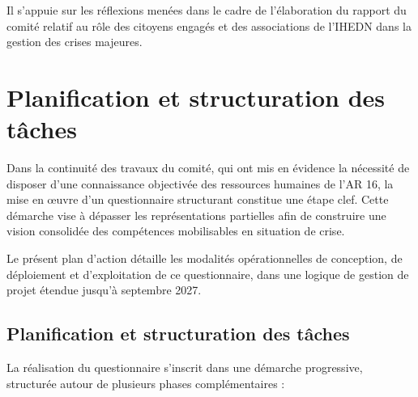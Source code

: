 \documentclass[12pt,a4paper]{article}
\begin{document}
Il s'appuie sur les réflexions menées dans le cadre de l'élaboration du rapport du comité relatif au rôle des citoyens engagés et des associations de l'IHEDN dans la gestion des crises majeures.

\section{Planification et structuration des tâches}

Dans la continuité des travaux du comité, qui ont mis en évidence la nécessité de disposer d'une connaissance objectivée des ressources humaines de l'AR 16, la mise en œuvre d'un questionnaire structurant constitue une étape clef. Cette démarche vise à dépasser les représentations partielles afin de construire une vision consolidée des compétences mobilisables en situation de crise.

Le présent plan d'action détaille les modalités opérationnelles de conception, de déploiement et d'exploitation de ce questionnaire, dans une logique de gestion de projet étendue jusqu'à septembre 2027.

\subsection{Planification et structuration des tâches}

La réalisation du questionnaire s'inscrit dans une démarche progressive, structurée autour de plusieurs phases complémentaires :
\end{document}

